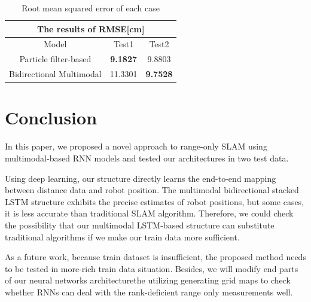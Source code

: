 \documentclass[letterpaper, 10 pt, conference]{ieeeconf}  %
\begin{document}
 
\begin{table}[h]
	\centering
	\begin{tabular}{cclcl}
		\hline
		\multicolumn{5}{c}{The results of RMSE{[}cm{]}}                                                                  \\ \hline
		\multicolumn{1}{c|}{Model}                    & \multicolumn{2}{c|}{Test1} & \multicolumn{2}{c}{Test2}      \\ \hline
		\multicolumn{1}{c|}{Particle filter-based}    & \multicolumn{2}{c|}{\textbf{9.1827}}     & \multicolumn{2}{c}{9.8803}          \\
		\multicolumn{1}{c|}{Bidirectional Multimodal} & \multicolumn{2}{c|}{11.3301}     & \multicolumn{2}{c}{\textbf{9.7528}}
	\end{tabular}
	\caption{Root mean squared error of each case}
	\label{RMSE_table}
\end{table}


\section{Conclusion}

In this paper, we proposed a novel approach to range-only SLAM using multimodal-based RNN models and tested our architectures in two test data.

Using deep learning, our structure directly learns the end-to-end mapping between distance data and robot position. The multimodal bidirectional stacked LSTM structure exhibits the precise estimates of robot positions, but some cases, it is less accurate than traditional SLAM algorithm. Therefore, we could check the possibility that our multimodal LSTM-based structure can substitute traditional algorithms if we make our train data more sufficient. 

As a future work, because train dataset is insufficient, the proposed method needs to be tested in more-rich train data situation. Besides, we will modify end parts of our neural networks architecturethe utilizing generating grid maps to check whether RNNs can deal with the rank-deficient range only measurements well.



\end{document}
